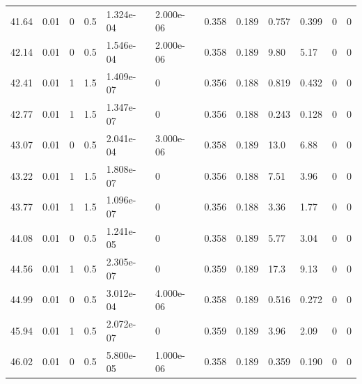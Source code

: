 \documentclass[preview]{standalone}
\begin{document}
{{{\begin{tabular}{L{1.2cm}C{1.2cm} C{0.3cm}C{0.5cm} C{1.4cm}C{1.4cm} C{1.4cm}C{1.4cm} C{1.6cm}C{1.6cm} C{1.6cm}C{1.6cm}}
  41.64  &  0.01  & 0     & 0.5 &  1.324e-04  & 2.000e-06  &  0.358&   0.189& 0.757 & 0.399   &  0 & 0  \\ 
  42.14  &  0.01  & 0     & 0.5 &  1.546e-04  & 2.000e-06  &  0.358&   0.189& 9.80 & 5.17   &  0 & 0  \\ 
  42.41  &  0.01  & 1     & 1.5 &  1.409e-07  & 0  &  0.356&   0.188& 0.819 & 0.432   &  0 & 0  \\ 
  42.77  &  0.01  & 1     & 1.5 &  1.347e-07  & 0  &  0.356&   0.188& 0.243 & 0.128   &  0 & 0  \\ 
  43.07  &  0.01  & 0     & 0.5 &  2.041e-04  & 3.000e-06  &  0.358&   0.189& 13.0 & 6.88   &  0 & 0  \\ 
  43.22  &  0.01  & 1     & 1.5 &  1.808e-07  & 0  &  0.356&   0.188& 7.51 & 3.96   &  0 & 0  \\ 
  43.77  &  0.01  & 1     & 1.5 &  1.096e-07  & 0  &  0.356&   0.188& 3.36 & 1.77   &  0 & 0  \\ 
  44.08  &  0.01  & 0     & 0.5 &  1.241e-05  & 0  &  0.358&   0.189& 5.77 & 3.04   &  0 & 0  \\ 
  44.56  &  0.01  & 1     & 0.5 &  2.305e-07  & 0  &  0.359&   0.189& 17.3 & 9.13   &  0 & 0  \\ 
  44.99  &  0.01  & 0     & 0.5 &  3.012e-04  & 4.000e-06  &  0.358&   0.189& 0.516 & 0.272   &  0 & 0  \\ 
  45.94  &  0.01  & 1     & 0.5 &  2.072e-07  & 0  &  0.359&   0.189& 3.96 & 2.09   &  0 & 0  \\ 
  46.02  &  0.01  & 0     & 0.5 &  5.800e-05  & 1.000e-06  &  0.358&   0.189& 0.359 & 0.190   &  0 & 0  \\ 
\hline 
\end{tabular} 

}}}
\end{document}
